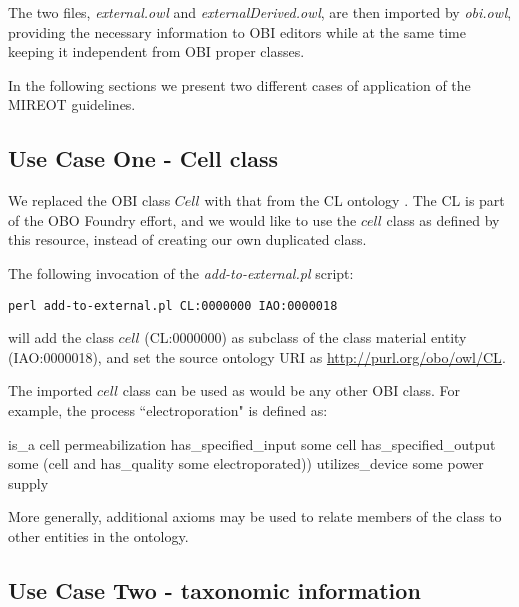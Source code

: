 \documentclass[a4paper,10pt,twocolumn]{article}
\begin{document}
The two files, \emph{external.owl} and \emph{externalDerived.owl}, are then imported by \emph{obi.owl}, providing the necessary information to OBI editors while at the same time keeping it independent from OBI proper classes.

In the following sections we present two different cases of application of the \ac{MIREOT} guidelines.


\subsection*{Use Case One - Cell class}

We replaced the \ac{OBI} class $Cell$ with that from the \ac{CL} ontology \cite{RefWorks:1559}. 
The \ac{CL} is part of the \ac{OBO} Foundry effort, and we would like to use the $cell$ class as defined by this resource, instead of creating our own duplicated class.

The following invocation of the \emph{add-to-external.pl} script:

\begin{footnotesize}
\begin{verbatim}
perl add-to-external.pl CL:0000000 IAO:0000018
\end{verbatim}
\end{footnotesize}

will add the class $cell$ (CL:0000000) as subclass of the class material entity (IAO:0000018), and set the source ontology URI as \url{http://purl.org/obo/owl/CL}.


The imported $cell$ class can be used as would be any other OBI class. For example, the process ``electroporation" is defined as:

\begin{footnotesize}
\begin{verbatimtab}
is_a cell permeabilization
has_specified_input some cell
has_specified_output some 
   (cell and has_quality some electroporated))
utilizes_device some power supply
\end{verbatimtab}
\end{footnotesize}

More generally, additional axioms may be used to relate members of the class to other entities in the ontology.


\subsection*{Use Case Two - taxonomic information}
\end{document}
